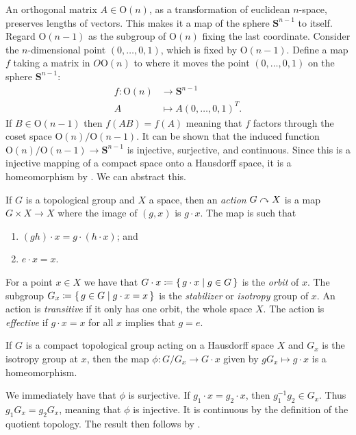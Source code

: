 \documentclass[letterpaper, 11pt, oneside]{book}
\begin{document}
An orthogonal matrix $A \in \text{O}(n)$, as a transformation of euclidean $n$-space, preserves lengths of vectors.
This makes it a map of the sphere $\textbf{S}^{n - 1}$ to itself.
Regard $\text{O}(n - 1)$ as the subgroup of $\text{O}(n)$ fixing the last coordinate.
Consider the $n$-dimensional point $(0, \ldots, 0, 1)$, which is fixed by $\text{O}(n - 1)$.
Define a map $f$ taking a matrix in $O\text{O}(n)$ to where it moves the point $(0, \ldots, 0, 1)$ on the sphere $\textbf{S}^{n - 1}$:
\begin{align*}
  f\colon \text{O}(n) &\to \textbf{S}^{n - 1} \\
             A &\mapsto A (0, \ldots, 0, 1)^{T}.
\end{align*}
If $B \in \text{O}(n - 1)$ then $f(AB) = f(A)$ meaning that $f$ factors through the coset space $\text{O}(n) / \text{O}(n - 1)$.
It can be shown that the induced function $\text{O}(n) / \text{O}(n - 1) \to \textbf{S}^{n - 1}$ is injective, surjective, and continuous.
Since this is a injective mapping of a compact space onto a Hausdorff space, it is a homeomorphism by .
We can abstract this.

\begin{defn}
  If $G$ is a topological group and $X$ a space, then an \emph{action} $G \curvearrowright X$ is a map $G \times X \to X$ where the image of $(g, x)$ is $g \cdot x$.
  The map is such that
  \begin{enumerate}
  \item $(gh) \cdot x = g \cdot (h \cdot x)$; and
  \item $e \cdot x = x$.
  \end{enumerate}
  For a point $x \in X$ we have that $G \cdot x \coloneqq \set{g \cdot x | g \in G}$ is the \emph{orbit} of $x$.
  The subgroup $G_{x} \coloneqq \set{g \in G | g \cdot x = x}$ is the \emph{stabilizer} or \emph{isotropy} group of $x$.
  An action is \emph{transitive} if it only has one orbit, the whole space $X$.
  The action is \emph{effective} if $g \cdot x = x$ for all $x$ implies that $g = e$.
\end{defn}

\begin{prop}
  If $G$ is a compact topological group acting on a Hausdorff space $X$ and $G_{x}$ is the isotropy group at $x$, then the map $\phi\colon G / G_{x} \to G \cdot x$ given by $g G_{x} \mapsto g \cdot x$ is a homeomorphism.
\end{prop}
\begin{pf}
  We immediately have that $\phi$ is surjective.
  If $g_{1} \cdot x = g_{2} \cdot x$, then $g_{1}^{-1} g_{2} \in G_{x}$.
  Thus $g_{1} G_{x} = g_{2} G_{x}$, meaning that $\phi$ is injective.
  It is continuous by the definition of the quotient topology.
  The result then follows by .
\end{pf}
\end{document}
